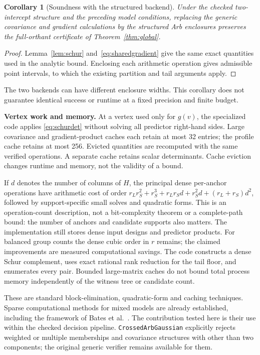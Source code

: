 \documentclass[preprint,11pt,numbers]{elsarticle}
\newtheorem{corollary}[theorem]{Corollary}
\theoremstyle{remark}\newtheorem{remark}[theorem]{Remark}
\begin{document}
\begin{corollary}[Soundness with the structured backend]
Under the checked two-intercept structure and the preceding model conditions,
replacing the generic covariance and gradient calculations by the structured
Arb enclosures preserves the full-orthant certificate of Theorem~\ref{thm:global}.
\end{corollary}
\begin{proof}
Lemma~\ref{lem:schur} and~\eqref{eq:sharedgradient} give the same exact quantities
used in the analytic bound. Enclosing each arithmetic operation gives admissible
point intervals, to which the existing partition and tail arguments apply.
\end{proof}
The two backends can have different enclosure widths. This corollary does not
guarantee identical success or runtime at a fixed precision and finite budget.

\textbf{Vertex work and memory.}
At a vertex used only for $g(v)$, the specialized code applies
\eqref{eq:schurdet} without solving all predictor right-hand sides. Large
covariance and gradient-product caches each retain at most 32 entries; the
profile cache retains at most 256. Evicted quantities are recomputed with the
same verified operations. A separate cache retains scalar determinants.
Cache eviction changes runtime and memory, not the validity of a bound.

If $d$ denotes the number of columns of $H$, the principal dense per-anchor
operations have arithmetic cost of order
$r_Lr_S^2+r_S^3+r_Lr_Sd+r_S^2d+(r_L+r_S)d^2$, followed by support-specific
small solves and quadratic forms. This is an operation-count description, not
a bit-complexity theorem or a complete-path bound: the number of anchors and
candidate supports also matters. The implementation still stores dense input
designs and predictor products. For balanced group counts the dense cubic
order in $r$ remains; the claimed improvements are measured computational savings.
The code
constructs a dense Schur complement, uses exact
rational rank reduction for the tail floor, and enumerates every pair. Bounded
large-matrix caches do not bound total process memory independently of the
witness tree or candidate count.

These are standard block-elimination, quadratic-form and caching techniques.
Sparse computational methods for mixed models are already established, including
the framework of Bates et al.~\cite{lme4}. The contribution tested here is their
use within the checked decision pipeline. \texttt{CrossedArbGaussian} explicitly
rejects weighted or multiple memberships and covariance structures with other
than two components; the original generic verifier remains available for them.
\end{document}
